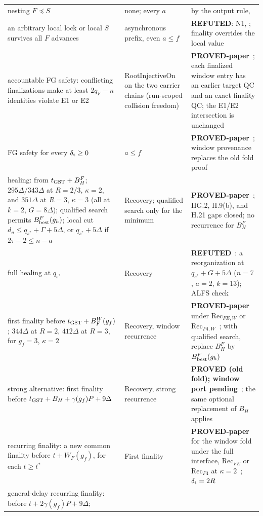 \documentclass{article}
\theoremstyle{plain}
\theoremstyle{definition}
\theoremstyle{remark}
\newcommand{\REFUTED}{\textbf{REFUTED}}
\begin{document}
\begin{center}
\begin{longtable}{>{\raggedright\arraybackslash}p{5.4cm}
  >{\raggedright\arraybackslash}p{1.9cm}
  >{\raggedright\arraybackslash}p{5.6cm}}
nesting $F\preceq S$ & none; every $a$ & by the output rule,
  \cite[\S7]{FB}\\
an arbitrary local lock or local $S$ survives all $F$ advances &
  asynchronous prefix, even $a\leq f$ & \REFUTED: N1,
  \cite[\S5]{FB}; finality overrides the local value\\
accountable FG safety: conflicting finalizations make at least
  $2q_F-n$ identities violate E1 or E2 & \textsf{RootInjectiveOn} on the
  two carrier chains (run-scoped collision freedom) &
  \textbf{PROVED-paper}~\cite[\S4]{FW}; each finalized window entry has
  an earlier target QC and an exact finality QC; the E1/E2 intersection is unchanged\\
FG safety for every $\delta_{\rm t}\geq0$ & $a\leq f$ &
  \textbf{PROVED-paper}~\cite[\S4]{FW}; window provenance replaces the old fold proof\\
healing: from $t_{\rm GST}+B_H^F$; $295\Delta/343\Delta$ at $R=2/3$,
  $\kappa=2$, and $351\Delta$ at $R=3$, $\kappa=3$ (all at $k=2$, $G=8\Delta$);
  qualified search permits $B_{\rm best}^F(g_h)$;
  local cut $d_u\leq q_{s^*}+\Gamma+5\Delta$, or $q_{s^*}+5\Delta$
  if $2\tau-2\leq n-a$ & Recovery; qualified search only for the minimum &
  \textbf{PROVED-paper}~\cite[W1--W3, HG.2--HG.6, H.9(b), H.9-Q--H.11-Q, H.18--H.22]{BPH};
  HG.2, H.9(b), and H.21 gaps closed; no recurrence for $B_H^F$\\
full healing at $q_{s^*}$ & Recovery &
  \REFUTED~\cite[\S6]{H12}: a reorganization at $q_{s^*}+G+5\Delta$
  ($n=7$, $a=2$, $k=13$); ALFS check~\cite[\S3.4]{ALFS}\\
first finality before $t_{\rm GST}+B_F^W(g_f)$;
  $344\Delta$ at $R=2$, $412\Delta$ at $R=3$, for $g_f=3$, $\kappa=2$ &
  Recovery, window recurrence & \textbf{PROVED-paper} under
  $\mathrm{Rec}_{FE,W}$ or $\mathrm{Rec}_{F4,W}$~\cite[FF5]{BPF};
  with qualified search, replace $B_H^F$ by $B_{\rm best}^F(g_h)$\\
strong alternative: first finality before
  $t_{\rm GST}+B_H+\gamma(g_f)P+9\Delta$ &
  Recovery, strong recurrence & \textbf{PROVED (old fold); window port pending}~\cite[FF5-S]{BPF}; the same
  optional replacement of $B_H$ applies\\
recurring finality: a new common finality before $t+W_F(g_f)$,
  for each $t\geq t^*$ & First finality &
  \textbf{PROVED-paper} for the window fold under the full interface,
  $\mathrm{Rec}_{FE}$ or $\mathrm{Rec}_{F4}$ at $\kappa=2$~\cite[\S5]{FW};
  $\delta_{\rm t}=2R$\\
general-delay recurring finality: before $t+2\gamma(g_f)P+9\Delta$;

\end{longtable}
\end{center}
\end{document}
